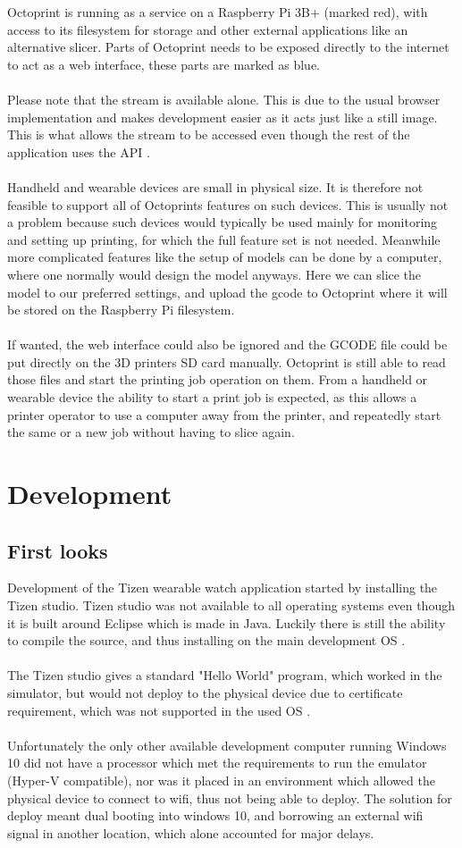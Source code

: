 \documentclass[a4paper, 12pt]{article}
\newcommand{\mysection}[1]{\section*{#1} \addcontentsline{toc}{section}{#1}}
\newcommand{\mysubsection}[1]{\subsection*{#1} \addcontentsline{toc}{subsection}{#1}}
\begin{document}
    Octoprint is running as a service on a Raspberry Pi 3B+ (marked red), with access to its filesystem for storage and other
    external applications like an alternative slicer.
    Parts of Octoprint needs to be exposed directly to the internet to act as a web interface, these parts are marked as
    blue.
    \\\\
    Please note that the stream is available alone.
    This is due to the usual browser implementation and makes development easier as it acts just like a still image.
    This is what allows the stream to be accessed even though the rest of the application uses the API .
    \\\\
    Handheld and wearable devices are small in physical size.
    It is therefore not feasible to support all of Octoprints features on such devices.
    This is usually not a problem because such devices would typically be used mainly for monitoring and setting up printing,
    for which the full feature set is not needed.
    Meanwhile more complicated features like the setup of models can be done by a computer, where one normally would design
    the model anyways.
    Here we can slice the model to our preferred settings, and upload the gcode to Octoprint where it will be stored on
    the Raspberry Pi filesystem.
    \\\\
    If wanted, the web interface could also be ignored and the GCODE file could be put directly on the 3D printers SD card
    manually.
    Octoprint is still able to read those files and start the printing job operation on them.
    From a handheld or wearable device the ability to start a print job is expected, as this allows a printer operator
    to use a computer away from the printer, and repeatedly start the same or a new job without having to slice again.

    \newpage

    \mysection{Development}
    \mysubsection{First looks}
    Development of the Tizen wearable watch application started by installing the Tizen studio.
    Tizen studio was not available to all operating systems even though it is built around Eclipse which is made in Java.
    Luckily there is still the ability to compile the source, and thus installing on the main development OS .
    \\\\
    The Tizen studio gives a standard "Hello World" program, which worked in the simulator, but would not deploy to the
    physical device due to certificate requirement, which was not supported in the used OS .
    \\\\
    Unfortunately the only other available development computer running Windows 10 did not have a processor which met
    the requirements to run the emulator (Hyper-V compatible), nor was it placed in an environment which allowed the physical device to connect
    to wifi, thus not being able to deploy.
    The solution for deploy meant dual booting into windows 10, and borrowing an external wifi signal in another
    location, which alone accounted for major delays.
\end{document}
